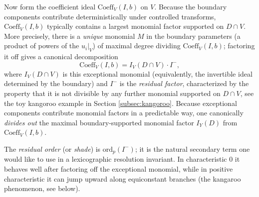 \documentclass[11pt]{amsart}
\begin{document}
Now form the coefficient ideal $\mathrm{Coeff}_V(I,b)$ on $V$.  Because the boundary components
contribute deterministically under controlled transforms, $\mathrm{Coeff}_V(I,b)$ typically contains a
largest monomial factor supported on $D\cap V$.  More precisely, there is a \emph{unique} monomial
$M$ in the boundary parameters (a product of powers of the $u_i|_V$) of maximal degree dividing
$\mathrm{Coeff}_V(I,b)$; factoring it off gives a canonical decomposition
\begin{equation}\label{eq:coeff-factor-elab}
\mathrm{Coeff}_V(I,b)= I_V(D\cap V)\cdot I^-,
\end{equation}
where $I_V(D\cap V)$ is this exceptional monomial (equivalently, the invertible ideal determined by the
boundary) and $I^-$ is the \emph{residual factor}, characterized by the property that it is not divisible by any further
monomial supported on $D\cap V$, see the toy kangoroo example in Section \ref{subsec:kangoroo}. Because exceptional components contribute monomial factors in a predictable way, one canonically
\emph{divides out} the maximal boundary-supported monomial factor $I_Y(D)$ from $\mathrm{Coeff}_V(I,b)$.

The \emph{residual order} (or \emph{shade}) is $\mathrm{ord}_p(I^-)$; it is the natural secondary term one
would like to use in a lexicographic resolution invariant.  In characteristic $0$ it behaves well after
factoring off the exceptional monomial, while in positive characteristic it can jump upward along
equiconstant branches (the kangaroo phenomenon, see below).
\end{document}
